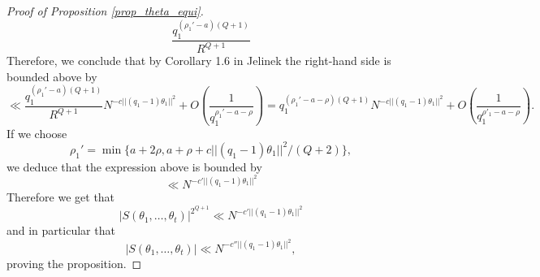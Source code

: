 \documentclass[12pt]{amsart}
\theoremstyle{definition}
\numberwithin{equation}{section}
\numberwithin{equation}{section}
\begin{document}
\begin{proof}[Proof of Proposition \ref{prop_theta_equi}]
	\[
		\frac{q_1^{(\rho_1'-a)(Q+1)}}{R^{Q+1}}
	\]
	Therefore, we conclude that by Corollary 1.6 in Jelinek \cite{Jelinek2025} the right-hand side is bounded above by
	\begin{equation*}
		\ll \frac{q_1^{(\rho_1'- a)(Q+1)}}{R^{Q+1}} N^{-c||(q_1-1)\theta_1||^2} + O\left(\frac{1}{q_1^{\rho_1'-a-\rho}} \right)= q_1^{(\rho_1' - a - \rho)(Q+1)} N^{-c||(q_1-1)\theta_1||^2} + O\left(\frac{1}{q_1^{\rho'_1-a-\rho}} \right).
	\end{equation*}
	If we choose 
	\[
		\rho_1'=\min\{a+2\rho, a+\rho + c||(q_1-1)\theta_1||^2/(Q+2)\},
	\]
	we deduce that the expression above is bounded by
	\begin{equation*}
		 \ll N^{-c'||(q_1-1)\theta_1||^2}
	\end{equation*} Therefore we get that
	\begin{equation}
		|S(\theta_1, \dots, \theta_t)|^{2^{Q+1}} \ll N^{-c'||(q_1-1)\theta_1||^2}
	\end{equation}
	and in particular that
	\begin{equation}
		|S(\theta_1, \dots, \theta_t)| \ll N^{-c''||(q_1-1)\theta_1||^2},
	\end{equation}
	proving the proposition.
\end{proof}
\end{document}
